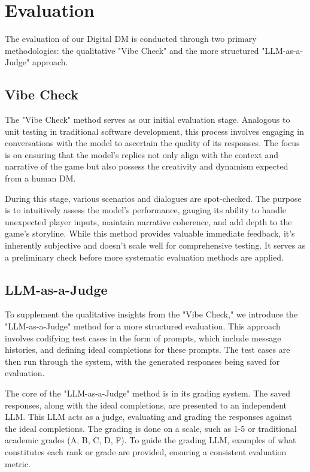 \documentclass[letterpaper]{article}
\begin{document}
\section{Evaluation}

The evaluation of our Digital DM is conducted through two primary methodologies: the qualitative "Vibe Check" and the more structured "LLM-as-a-Judge" approach.

\subsection{Vibe Check}
The "Vibe Check" method serves as our initial evaluation stage. Analogous to unit testing in traditional software development, this process involves engaging in conversations with the model to ascertain the quality of its responses. The focus is on ensuring that the model's replies not only align with the context and narrative of the game but also possess the creativity and dynamism expected from a human DM.

During this stage, various scenarios and dialogues are spot-checked. The purpose is to intuitively assess the model's performance, gauging its ability to handle unexpected player inputs, maintain narrative coherence, and add depth to the game's storyline. While this method provides valuable immediate feedback, it's inherently subjective and doesn't scale well for comprehensive testing. It serves as a preliminary check before more systematic evaluation methods are applied.

\subsection{LLM-as-a-Judge}
To supplement the qualitative insights from the "Vibe Check," we introduce the "LLM-as-a-Judge" method \cite{zheng2023judging} for a more structured evaluation. This approach involves codifying test cases in the form of prompts, which include message histories, and defining ideal completions for these prompts. The test cases are then run through the system, with the generated responses being saved for evaluation.

The core of the "LLM-as-a-Judge" method is in its grading system. The saved responses, along with the ideal completions, are presented to an independent LLM. This LLM acts as a judge, evaluating and grading the responses against the ideal completions. The grading is done on a scale, such as 1-5 or traditional academic grades (A, B, C, D, F). To guide the grading LLM, examples of what constitutes each rank or grade are provided, ensuring a consistent evaluation metric.
\end{document}
